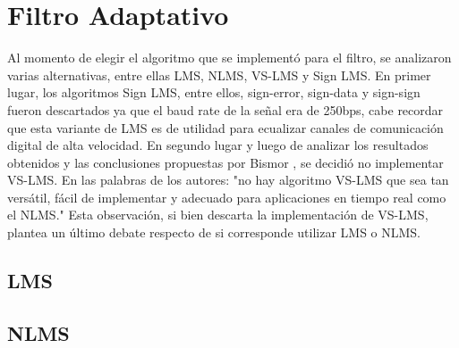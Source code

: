 \documentclass[main.tex]{subfiles}
\begin{document}
\section{Filtro Adaptativo}
Al momento de elegir el algoritmo que se implementó para el filtro, 
se analizaron varias alternativas, entre ellas LMS, NLMS, VS-LMS y Sign LMS.
En primer lugar, los algoritmos Sign LMS, entre ellos, sign-error, sign-data
y sign-sign fueron descartados ya que el baud rate de la señal era de 250bps,
cabe recordar que esta variante de LMS es de utilidad para ecualizar canales de
comunicación digital de alta velocidad. En segundo lugar y  luego de analizar 
los resultados obtenidos y las conclusiones propuestas por Bismor \cite{bismor},
se decidió no implementar VS-LMS. En las palabras de los autores: 
"no hay algoritmo VS-LMS que sea tan versátil, fácil de implementar y adecuado 
para aplicaciones en tiempo real como el NLMS."\newline
Esta observación, si bien descarta la implementación de VS-LMS, 
plantea un último debate respecto de si corresponde utilizar LMS o NLMS. 

\subsection{LMS}
\subsection{NLMS}
\end{document}
